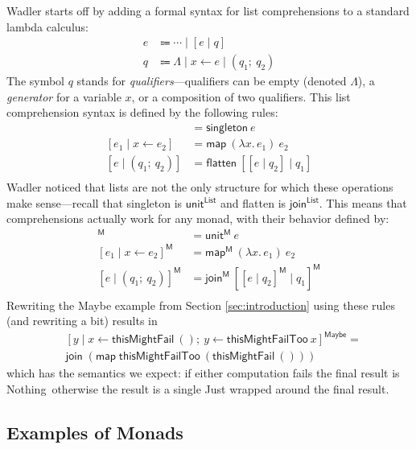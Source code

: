 \documentclass[acmsmall, nonacm, screen]{acmart}
\newcommand{\lambdaE}[2]{\lambda #1.\, #2}
\newcommand{\nothing}{\textsf{Nothing}}
\newcommand{\map}[3]{\textsf{map}^{\textsf{#1}}~#2~#3}
\newcommand{\unit}[2]{\textsf{unit}^{\textsf{#1}}~#2}
\newcommand{\join}[2]{\textsf{join}^{\textsf{#1}}~#2}
\begin{document}
Wadler starts off by adding a formal syntax for list comprehensions to a standard lambda calculus:
\begin{align*}
 e &\Coloneqq \cdots \mid [e \mid q] \\
 q &\Coloneqq \Lambda \mid x \leftarrow e \mid (q_1;\ q_2)
\end{align*}
The symbol $q$ stands for {\em qualifiers}---qualifiers can be empty (denoted $\Lambda$), a {\em
generator} for a variable $x$, or a composition of two qualifiers. This list comprehension syntax
is defined by the following rules:
\begin{align*}
  [e \mid \Lambda] &= \textsf{singleton}~e \\
  [e_1 \mid x \leftarrow e_2] &= \textsf{map}~(\lambdaE{x}{e_1})~e_2 \\
  [e \mid (q_1;\ q_2)] &= \textsf{flatten}~[[e \mid q_2] \mid q_1] \\
\end{align*}
Wadler noticed that lists are not the only structure for which these operations make
sense---recall that \textsf{singleton} is $\textsf{unit}^{\textsf{List}}$ and \textsf{flatten} is
$\textsf{join}^{\textsf{List}}$. This means that comprehensions actually work for any monad, with
their behavior defined by:
\begin{align*}
  [e \mid \Lambda]^{\textsf{M}} &= \unit{M}{e} \\
  [e_1 \mid x \leftarrow e_2]^{\textsf{M}} &= \map{M}{(\lambdaE{x}{e_1})}{e_2} \\
  [e \mid (q_1;\ q_2)]^{\textsf{M}} &= \join{M}{[[e \mid q_2]^{\textsf{M}} \mid q_1]^{\textsf{M}}} \\
\end{align*}
Rewriting the \textsf{Maybe} example from Section \ref{sec:introduction} using these rules (and
rewriting a bit) results in
\begin{align*}
  &[ y \mid x \leftarrow \textsf{thisMightFail}~() ;\ y \leftarrow \textsf{thisMightFailToo}~{x} ]^{\textsf{Maybe}} = \\
  &\join{}{(\map{}{\textsf{thisMightFailToo}}{(\textsf{thisMightFail}~())})}
\end{align*}
which has the semantics we expect: if either computation fails the final result is \nothing\,
otherwise the result is a single \textsf{Just} wrapped around the final result.

\subsection{Examples of Monads} \label{sec:monad-examples}
\end{document}
